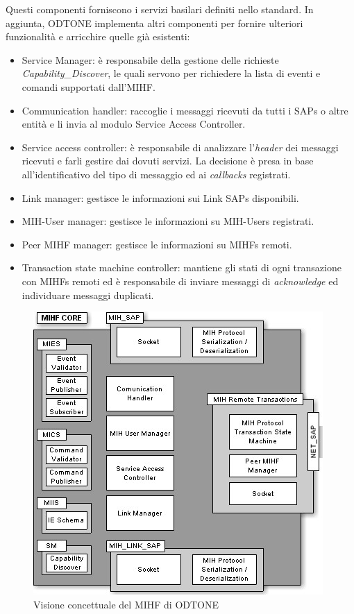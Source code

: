 Questi componenti forniscono i servizi basilari definiti nello standard. In aggiunta, ODTONE implementa altri componenti per fornire ulteriori funzionalità e arricchire quelle già esistenti:
\begin{itemize}
\item Service Manager: è responsabile della gestione delle richieste {\em Capability\_Discover}, le quali servono per richiedere la lista di eventi e comandi supportati dall'MIHF.

\item Communication handler: raccoglie i messaggi ricevuti da tutti i SAPs o altre entità e li invia al modulo Service Access Controller.

\item Service access controller: è responsabile di analizzare l'{\em header} dei messaggi ricevuti e farli gestire dai dovuti servizi. La decisione è presa in base all'identificativo del tipo di messaggio ed ai {\em callbacks} registrati.

\item Link manager: gestisce le informazioni sui Link SAPs disponibili.

\item MIH-User manager: gestisce le informazioni su MIH-Users registrati.

\item Peer MIHF manager: gestisce le informazioni su MIHFs remoti.

\item Transaction state machine controller: mantiene gli stati di ogni transazione con MIHFs remoti ed è responsabile di inviare messaggi di {\em acknowledge} ed individuare messaggi duplicati.

\end{itemize}

\begin{figure}
\centering
\includegraphics[]{mihfarch.jpg}
\caption{Visione concettuale del MIHF di ODTONE}
\end{figure}

